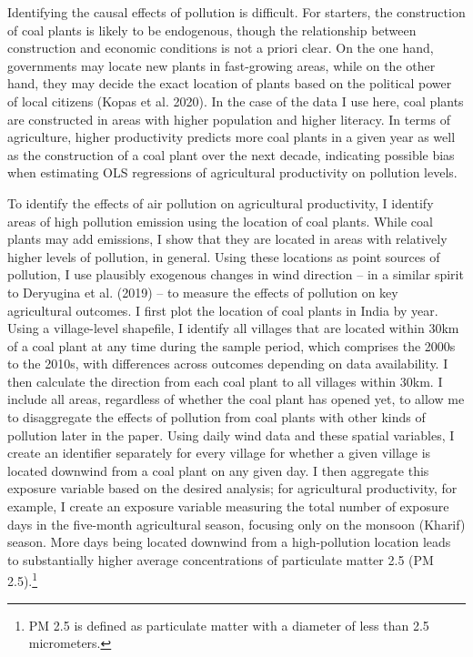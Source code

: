\documentclass[
]{article}
\begin{document}
Identifying the causal effects of pollution is difficult. For starters, the construction of coal plants is likely to be endogenous, though the relationship between construction and economic conditions is not a priori clear. On the one hand, governments may locate new plants in fast-growing areas, while on the other hand, they may decide the exact location of plants based on the political power of local citizens (Kopas et al. 2020). In the case of the data I use here, coal plants are constructed in areas with higher population and higher literacy. In terms of agriculture, higher productivity predicts more coal plants in a given year as well as the construction of a coal plant over the next decade, indicating possible bias when estimating OLS regressions of agricultural productivity on pollution levels.

To identify the effects of air pollution on agricultural productivity, I identify areas of high pollution emission using the location of coal plants. While coal plants may add emissions, I show that they are located in areas with relatively higher levels of pollution, in general. Using these locations as point sources of pollution, I use plausibly exogenous changes in wind direction -- in a similar spirit to Deryugina et al. (2019) -- to measure the effects of pollution on key agricultural outcomes. I first plot the location of coal plants in India by year. Using a village-level shapefile, I identify all villages that are located within 30km of a coal plant at any time during the sample period, which comprises the 2000s to the 2010s, with differences across outcomes depending on data availability. I then calculate the direction from each coal plant to all villages within 30km. I include all areas, regardless of whether the coal plant has opened yet, to allow me to disaggregate the effects of pollution from coal plants with other kinds of pollution later in the paper. Using daily wind data and these spatial variables, I create an identifier separately for every village for whether a given village is located downwind from a coal plant on any given day. I then aggregate this exposure variable based on the desired analysis; for agricultural productivity, for example, I create an exposure variable measuring the total number of exposure days in the five-month agricultural season, focusing only on the monsoon (Kharif) season. More days being located downwind from a high-pollution location leads to substantially higher average concentrations of particulate matter 2.5 (PM 2.5).\footnote{PM 2.5 is defined as particulate matter with a diameter of less than 2.5 micrometers.}
\end{document}
